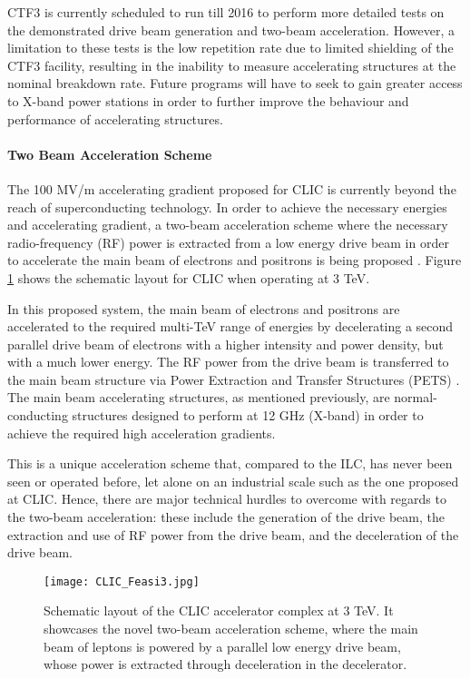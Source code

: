 CTF3 is currently scheduled to run till 2016 \cite{ICFA:BeamDynPress} to perform more detailed tests on the demonstrated drive beam generation and two-beam acceleration. However, a limitation to these tests is the low repetition rate due to limited shielding of the CTF3 facility, resulting in the inability to measure accelerating structures at the nominal breakdown rate. Future programs will have to seek to gain greater access to X-band power stations in order to further improve the behaviour and performance of accelerating structures.

\paragraph{Two Beam Acceleration Scheme}

The 100 MV/m accelerating gradient proposed for CLIC is currently beyond the reach of superconducting technology. In order to achieve the necessary energies and accelerating gradient, a two-beam acceleration scheme where the necessary radio-frequency (RF) power is extracted from a low energy drive beam in order to accelerate the main beam of electrons and positrons is being proposed \cite{AccSciTech:Wilson}. Figure \ref{fig:CLIC:Feasi3} shows the schematic layout for CLIC when operating at 3 TeV.

In this proposed system, the main beam of electrons and positrons are accelerated to the required multi-TeV range of energies by decelerating a second parallel drive beam of electrons with a higher intensity and power density, but with a much lower energy. The RF power from the drive beam is transferred to the main beam structure via Power Extraction and Transfer Structures (PETS) \cite{CLIC:Concept}. The main beam accelerating structures, as mentioned previously, are normal-conducting structures designed to perform at 12 GHz (X-band) in order to achieve the required high acceleration gradients.

This is a unique acceleration scheme that, compared to the ILC, has never been seen or operated before, let alone on an industrial scale such as the one proposed at CLIC. Hence, there are major technical hurdles to overcome with regards to the two-beam acceleration: these include the generation of the drive beam, the extraction and use of RF power from the drive beam, and the deceleration of the drive beam. \cite{CLIC:Concept}

\begin{figure}[!htb]
    \centering
    \texttt{[image: CLIC\_Feasi3.jpg]}
    
    \caption{Schematic layout of the CLIC accelerator complex at 3 TeV. It showcases the novel two-beam acceleration scheme, where the main beam of leptons is powered by a parallel low energy drive beam, whose power is extracted through deceleration in the decelerator. \cite{CLIC:Concept}}
    \label{fig:CLIC:Feasi3}
\end{figure}

